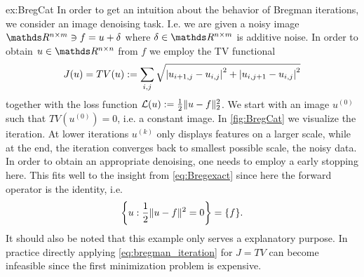 \begin{example}{}{ex:BregCat}
In order to get an intuition about the behavior of Bregman iterations, we consider an image denoising task. I.e. we are given a noisy image $\R^{n\times m}\ni f = u + \delta$ where $\delta\in\R^{n\times m}$ is additive noise. In order to obtain $u\in\R^{n\times n}$ from $f$ we employ the TV functional \cite{rudin1992nonlinear} 
%
\begin{align*}
J(u) = TV(u) := \sum_{i,j} \sqrt{\left|u_{i+1, j} - u_{i,j}\right|^2 + \left|u_{i,j+1} - u_{i,j}\right|^2}
\end{align*}
%
together with the loss function $\mathcal{L}(u):= \frac{1}{2}\|u-f\|^2_2$.
%
We start with an image $u^{(0)}$ such that $TV(u^{(0)})=0$, i.e. a constant image. In \cref{fig:BregCat} we visualize the iteration. At lower iterations $u^{(k)}$ only displays features on a larger scale, while at the end, the iteration converges back to smallest possible scale, the noisy data. In order to obtain an appropriate denoising, one needs to employ a early stopping here. This fits well to the insight from \cref{eq:Bregexact} since here the forward operator is the identity, i.e.
%
\begin{align*}
\left\{ u: \frac{1}{2}\|u-f\|^2=0\right\} = \{f\}. 
\end{align*}
%
It should also be noted that this example only serves a explanatory purpose. In practice directly applying \cref{eq:bregman_iteration} for $J=TV$ can become infeasible since the first minimization problem is expensive.
\end{example}%
%
%
%
%
